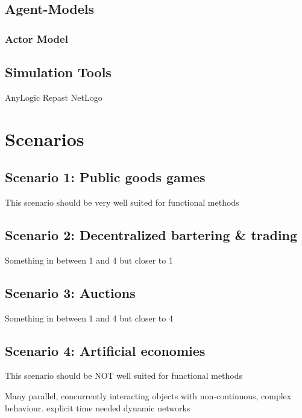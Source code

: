 \documentclass{article}
\begin{document}
\subsection{Agent-Models}
\subsubsection{Actor Model}
\cite{Poggi_2015}
\cite{Parker_2011}
\cite{DiStefano_2007}
\cite{Varela_2004}
\cite{DiStefano_2005}

\cite{Hewitt_1973}
 \cite{Greif_1975}
 \cite{Clinger_1981}
 \cite{Agha_1986}
 \cite{Agha_1997}
 \cite{Hewitt_2007}
 \cite{Hewitt_2010}
 \cite{Agha_2004}
\subsection{Simulation Tools}
AnyLogic
Repast
NetLogo

\section{Scenarios}
\subsection{Scenario 1: Public goods games}
This scenario should be very well suited for functional methods

\subsection{Scenario 2: Decentralized bartering \& trading}
Something in between 1 and 4 but closer to 1

\subsection{Scenario 3: Auctions}
Something in between 1 and 4 but closer to 4

\subsection{Scenario 4: Artificial economies}
This scenario should be NOT well suited for functional methods

Many parallel, concurrently interacting objects with non-continuous, complex behaviour.
explicit time needed
dynamic networks
\end{document}
